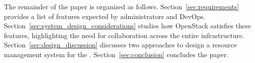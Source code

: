 

The remainder of the paper is organized as follows.
Section~\ref{sec:requirements} provides a list of features expected by administrators
and DevOps.
Section~\ref{sec:system_design_considerations} studies how OpenStack satisfies
these features, highlighting the need for collaboration across the
entire \edge infrastructure. Section~\ref{sec:design_discussion} discusses two
approaches to design a resource management system for the \edge.
Section~\ref{sec:conclusion} concludes the paper.


\vspace*{-.2cm}

